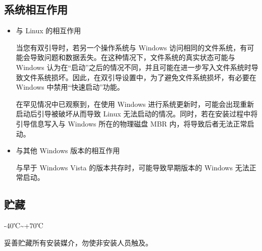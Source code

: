 \documentclass{article}
\begin{document}
\begin{multicols*}{3}





	\begin{tcolorbox}
	\section*{系统相互作用}
	\end{tcolorbox}
	\begin{itemize}[leftmargin=*]
		\setlength{\parindent}{0pt}

		\item 与 Linux 的相互作用

		当您有双引导时，若另一个操作系统与 Windows 访问相同的文件系统，有可能会导致问题和数据丢失。在这种情况下，文件系统的真实状态可能与 Windows 认为在“启动”之后的情况不同，并且可能在进一步写入文件系统时导致文件系统损坏。因此，在双引导设置中，为了避免文件系统损坏，有必要在 Windows 中禁用“快速启动”功能。

		在罕见情况中已观察到，在使用 Windows 进行系统更新时，可能会出现重新启动后引导被破坏从而导致 Linux 无法启动的情况。同时，若在安装过程中将引导信息写入与 Windows 所在的物理磁盘 MBR 内，将导致后者无法正常启动。

		\item 与其他 Windows 版本的相互作用

		与早于 Windows Vista 的版本共存时，可能导致早期版本的 Windows 无法正常启动。

	\end{itemize}


	\begin{tcolorbox}
	\section*{贮藏}
	\end{tcolorbox}

	-40℃\textasciitilde +70℃

	妥善贮藏所有安装媒介，勿使非安装人员触及。

	\medskip



\end{multicols*}
\end{document}
